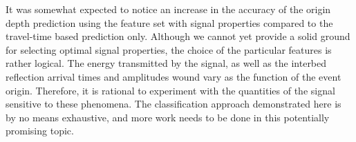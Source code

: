 \documentclass[letterpaper,11pt]{article}
\begin{document}
It was somewhat expected to notice an increase in the accuracy of the origin depth prediction using the feature set with signal properties compared to the travel-time based prediction only. Although we cannot yet provide a solid ground for selecting optimal signal properties, the choice of the particular features is rather logical. The energy transmitted by the signal, as well as the interbed reflection arrival times and amplitudes wound vary as the function of the event origin. Therefore, it is rational to experiment with the quantities of the signal sensitive to these phenomena. The classification approach demonstrated here is by no means exhaustive, and more work needs to be done in this potentially promising topic.




\end{document}
